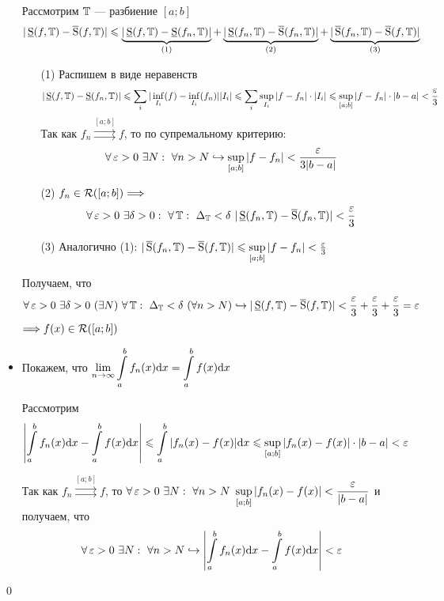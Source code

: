 \documentclass[a4paper, 10pt]{article}
\begin{document}
\begin{itemize}
    Рассмотрим $\operatorname{\mathbb{T}}$ — разбиение $[a;b]$
    \begin{equation*}
        |\operatorname{\underline{S}}(f,\operatorname{\mathbb{T}})-\operatorname{\overline{S}}(f,\operatorname{\mathbb{T}})|\leqslant\underbrace{|\operatorname{\underline{S}}(f,\operatorname{\mathbb{T}})-\operatorname{\underline{S}}(f_n,\operatorname{\mathbb{T}})|}_{(1)}+\underbrace{|\operatorname{\underline{S}}(f_n,\operatorname{\mathbb{T}})-\operatorname{\overline{S}}(f_n,\operatorname{\mathbb{T}})|}_{(2)}+\underbrace{|\operatorname{\overline{S}}(f_n,\operatorname{\mathbb{T}})-\operatorname{\overline{S}}(f,\operatorname{\mathbb{T}})|}_{(3)}
    \end{equation*}
    \begin{enumerate}
        \item[(1)] Распишем в виде неравенств
        \begin{equation*}
            |\us(f,\T)-\us(f_n,\T)|\leqslant\sum_{i}|\inf\limits_{I_i}(f)-\inf\limits_{I_i}(f_n)||I_i|\leqslant \sum_{i}\sup\limits_{I_i}|f-f_n|\cdot|I_i|\leqslant\sup\limits_{[a;b]}|f-f_n|\cdot|b-a|<\frac{\ve}{3}
        \end{equation*}
        Так как $f_n\overset{[a;b]}{\rightrightarrows}f$, то по супремальному критерию:
        \begin{equation*}
            \forall\operatorname{\varepsilon}>0\ \exists N:\ \forall n>N\hookrightarrow\sup\limits_{[a;b]}|f-f_n|<\frac{\operatorname{\varepsilon}}{3|b-a|}
        \end{equation*}
        \item[(2)] $f_n\in\mathcal{R}([a;b])\Longrightarrow$
        \begin{equation*}
            \forall\ve>0\ \exists\delta>0:\ \forall\T:\ \Delta_{\T}<\delta\ |\us(f_n,\T)-\os(f_n,\T)|<\frac{\ve}{3}
        \end{equation*}
        \item[(3)] Аналогично (1): $|\operatorname{\overline{S}}(f_n,\operatorname{\mathbb{T}})-\operatorname{\overline{S}}(f,\operatorname{\mathbb{T}})|\leqslant\sup\limits_{[a;b]}|f-f_n|<\frac{\operatorname{\varepsilon}}{3}$
    \end{enumerate}
    Получаем, что
    \begin{equation*}
        \forall\ve>0\ \exists\delta>0\ (\exists N)\ \forall \T:\ \Delta_{\T}<\delta\ (\forall n>N)\hookrightarrow|\us(f,\T)-\os(f,\T)|<\frac{\ve}{3}+\frac{\ve}{3}+\frac{\ve}{3}=\ve
    \end{equation*}
    $\Longrightarrow f(x)\in\mathcal{R}([a;b])$

    \item Покажем, что $\lim\limits_{n\to\infty}\displaystyle\int\limits_{a}^b f_n(x)\text{d}x=\int\limits_{a}^b f(x)\text{d}x$
    
    Рассмотрим
    \begin{equation*}
        \left|\int\limits_{a}^b f_n(x)\text{d}x-\int\limits_{a}^b f(x)\text{d}x\right|\leqslant\int\limits_a^b|f_n(x)-f(x)|\text{d}x\leqslant\sup\limits_{[a;b]}|f_n(x)-f(x)|\cdot|b-a|<\operatorname{\varepsilon}
    \end{equation*}

    Так как $f_n\overset{[a;b]}{\rightrightarrows}f$, то $\forall\ve>0\ \exists N:\ \forall n>N\ \sup\limits_{[a;b]}|f_n(x)-f(x)|<\displaystyle\frac{\ve}{|b-a|}$ и получаем, что 
    \begin{equation*}
        \forall \operatorname{\varepsilon}>0\ \exists N:\ \forall n>N\hookrightarrow \left|\int\limits_{a}^b f_n(x)\text{d}x-\int\limits_{a}^b f(x)\text{d}x\right|<\operatorname{\varepsilon}
    \end{equation*}
\end{itemize}\qed
\end{document}
